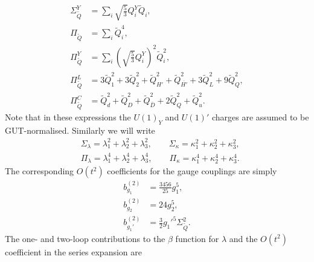 \documentclass[preprint,amsmath,amssymb,aps,superscriptaddress,prd,showpacs,floatfix,nofootinbib]{revtex4-1}
\begin{document}
\begin{align*}
\Sigma_{\tilde{Q}}^Y&=\sum_i \sqrt{\frac{5}{3}}Q_i^Y\tilde{Q}_i,\\
\Pi_{\tilde{Q}}&=\sum_i \tilde{Q}_i^4,\\
\Pi_{\tilde{Q}}^Y&=\sum_i \left ( \sqrt{\frac{5}{3}}Q_i^Y\right )^2\tilde{Q}_i^2,\\
\Pi_{\tilde{Q}}^L&=3\tilde{Q}_1^2+3\tilde{Q}_2^2+\tilde{Q}_{H'}^2+\tilde{Q}_{\overline{H'}}^2+3\tilde{Q}_L^2+9\tilde{Q}_Q^2,\\
\Pi_{\tilde{Q}}^C&=\tilde{Q}_d^2+\tilde{Q}_D^2+\tilde{Q}_{\overline{D}}^2+2\tilde{Q}_Q^2+\tilde{Q}_u^2.
\end{align*}
Note that in these expressions the $U(1)_Y$ and $U(1)'$ charges are assumed to be GUT-normalised. Similarly we will write
\begin{align*}
&\Sigma_\lambda=\lambda_1^2+\lambda_2^2+\lambda_3^2, \qquad \Sigma_\kappa=\kappa_1^2+\kappa_2^2+\kappa_3^2,\\
&\Pi_\lambda=\lambda_1^4+\lambda_2^4+\lambda_3^4,\qquad \Pi_\kappa=\kappa_1^4+\kappa_2^4+\kappa_3^4.
\end{align*}
The corresponding $O(t^2)$ coefficients for the gauge couplings are simply
\begin{subequations}\label{eq:USSMGaugeOt2Coeffs}
\begin{align}
b_{g_1}^{(2)}&=\frac{3456}{25}g_1^5,\label{eq:USSMg1Ot2Coeff}\\
b_{g_2}^{(2)}&=24g_2^5,\label{eq:USSMg2Ot2Coeff}\\
b_{g_1'}^{(2)}&=\frac{3}{2}g_1'^5\Sigma_{\tilde{Q}}^2.\label{eq:USSMg1pOt2Coeff}
\end{align}
\end{subequations}
The one- and two-loop contributions to the $\beta$ function for $\lambda$
and the $O(t^2)$ coefficient in the series expansion are
\end{document}
